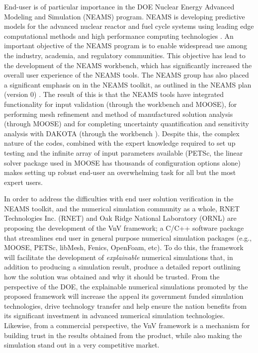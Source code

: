End-user \VV is of particular importance in the DOE Nuclear Energy Advanced Modeling and Simulation (NEAMS) program. NEAMS is developing predictive models for the advanced nuclear reactor and fuel cycle systems using leading edge computational methods and high performance computing technologies \cite{NEAMS}. An important objective of the NEAMS program is to enable widespread use among the industry, academia, and regulatory communities\cite{NEAMS}. This objective has lead to the development of the NEAMS workbench, which has significantly increased the overall user experience of the NEAMS tools. The NEAMS group has also placed a significant emphasis on \VV in the NEAMS toolkit, as outlined in the NEAMS \VV plan (version 0) \cite{}. The result of this is that the NEAMS tools have integrated functionality for input validation (through the workbench and MOOSE), for performing mesh refinement and method of manufactured solution analysis (through MOOSE) and for completing uncertainty quantification and sensitivity analysis with DAKOTA (through the workbench \cite{}). Despite this, the complex nature of the codes, combined with the expert knowledge required to set up \VV testing and the infinite array of input parameters available (PETSc, the linear solver package used in MOOSE has thousands of configuration options alone) makes setting up robust end-user \VV an overwhelming task for all but the most expert users.   

In order to address the difficulties with end user solution verification in the NEAMS toolkit, and the numerical simulation community as a whole, RNET Technologies Inc. (RNET) and Oak Ridge National Laboratory (ORNL) are proposing the development of the VnV framework; a C/C++ software package that streamlines end user \VV in general purpose numerical simulation packages (e.g., MOOSE, PETSc, libMesh, Fenics, OpenFoam, etc). To do this, the framework will facilitate the development of \emph{explainable} numerical simulations that, in addition to producing a simulation result, produce a detailed report outlining how the solution was obtained and why it should be trusted. From the perspective of the DOE, the explainable numerical simulations promoted by the proposed framework will increase the appeal its government funded simulation technologies, drive technology transfer and help ensure the nation benefits from its significant investment in advanced numerical simulation technologies. Likewise, from a commercial perspective, the VnV framework is a mechanism for building trust in the results obtained from the product, while also making the simulation stand out in a very competitive market. 


